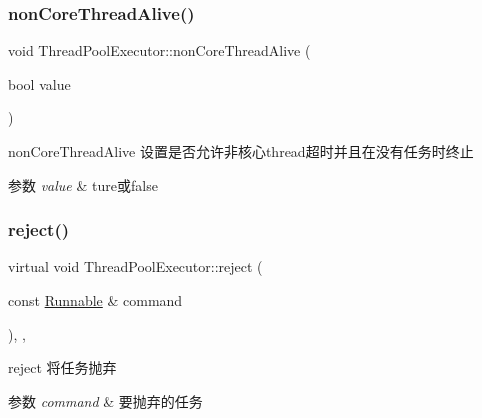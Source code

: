 \subsubsection{\texorpdfstring{non\+Core\+Thread\+Alive()}{nonCoreThreadAlive()}\hspace{0.1cm}{\footnotesize\ttfamily [2/2]}}
{\footnotesize\ttfamily void Thread\+Pool\+Executor\+::non\+Core\+Thread\+Alive (\begin{DoxyParamCaption}\item[{bool}]{value }\end{DoxyParamCaption})}



non\+Core\+Thread\+Alive 设置是否允许非核心thread超时并且在没有任务时终止 


\begin{DoxyParams}{参数}
{\em value} & ture或false \\
\hline
\end{DoxyParams}
\mbox{\label{classThreadPoolExecutor_a23a7c5908db3ef6f0e2afba6f0ca0450}} 
\subsubsection{\texorpdfstring{reject()}{reject()}}
{\footnotesize\ttfamily virtual void Thread\+Pool\+Executor\+::reject (\begin{DoxyParamCaption}\item[{const \hyperlink{classRunnable}{Runnable} \&}]{command }\end{DoxyParamCaption})\hspace{0.3cm}{\ttfamily [inline]}, {\ttfamily [protected]}, {\ttfamily [virtual]}}



reject 将任务抛弃 


\begin{DoxyParams}{参数}
{\em command} & 要抛弃的任务 \\
\hline
\end{DoxyParams}
\mbox{\label{classThreadPoolExecutor_a5d2d340118dd847534533f8bf2e9ae94}} 
